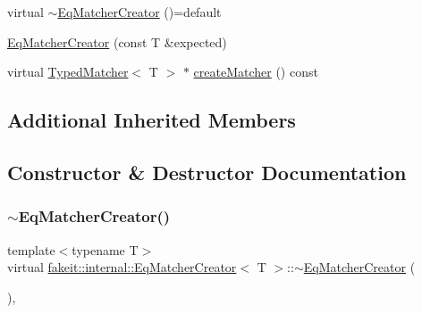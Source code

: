 \begin{DoxyCompactItemize}
\item 
virtual \mbox{\hyperlink{structfakeit_1_1internal_1_1EqMatcherCreator_acfe924d6373829891b5d0f53d88486f1}{$\sim$\+Eq\+Matcher\+Creator}} ()=default
\item 
\mbox{\hyperlink{structfakeit_1_1internal_1_1EqMatcherCreator_a0d1520f92d7a9eaa115022bb46f0ae3e}{Eq\+Matcher\+Creator}} (const T \&expected)
\item 
virtual \mbox{\hyperlink{structfakeit_1_1TypedMatcher}{Typed\+Matcher}}$<$ T $>$ $\ast$ \mbox{\hyperlink{structfakeit_1_1internal_1_1EqMatcherCreator_a0ab880ca3aa803487b6cbb418bc2ccfc}{create\+Matcher}} () const
\end{DoxyCompactItemize}
\subsection*{Additional Inherited Members}


\subsection{Constructor \& Destructor Documentation}
\mbox{\label{structfakeit_1_1internal_1_1EqMatcherCreator_acfe924d6373829891b5d0f53d88486f1}} 
\subsubsection{\texorpdfstring{$\sim$EqMatcherCreator()}{~EqMatcherCreator()}\hspace{0.1cm}{\footnotesize\ttfamily [1/9]}}
{\footnotesize\ttfamily template$<$typename T$>$ \\
virtual \mbox{\hyperlink{structfakeit_1_1internal_1_1EqMatcherCreator}{fakeit\+::internal\+::\+Eq\+Matcher\+Creator}}$<$ T $>$\+::$\sim$\mbox{\hyperlink{structfakeit_1_1internal_1_1EqMatcherCreator}{Eq\+Matcher\+Creator}} (\begin{DoxyParamCaption}{ }\end{DoxyParamCaption})\hspace{0.3cm}{\ttfamily [virtual]}, {\ttfamily [default]}}

\mbox{\label{structfakeit_1_1internal_1_1EqMatcherCreator_a0d1520f92d7a9eaa115022bb46f0ae3e}} 
